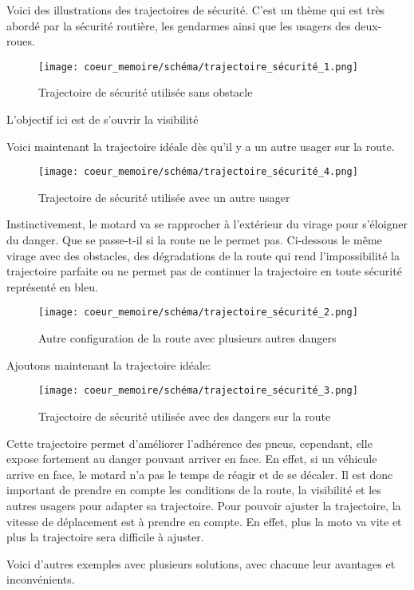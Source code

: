 \vspace{0.5cm}
Voici des illustrations des trajectoires de sécurité. C'est un thème qui est très abordé par la sécurité routière, les gendarmes ainsi que les usagers des deux-roues. 
\begin{figure}[H]
    \centering
    \texttt{[image: coeur\_memoire/schéma/trajectoire\_sécurité\_1.png]} 
    \caption{Trajectoire de sécurité utilisée sans obstacle}
\end{figure}
L'objectif ici est de s'ouvrir la visibilité

Voici maintenant la trajectoire idéale dès qu'il y a un autre usager sur la route.
\begin{figure}[H]
    \centering
    \texttt{[image: coeur\_memoire/schéma/trajectoire\_sécurité\_4.png]} 
    \caption{Trajectoire de sécurité utilisée avec un autre usager}
\end{figure}
Instinctivement, le motard va se rapprocher à l'extérieur du virage pour s'éloigner du danger.
Que se passe-t-il si la route ne le permet pas. Ci-dessous le même virage avec des obstacles, des dégradations de la route qui rend l'impossibilité la trajectoire parfaite ou ne permet pas de continuer la trajectoire en toute sécurité représenté en bleu. 
\begin{figure}[H]
    \centering
    \texttt{[image: coeur\_memoire/schéma/trajectoire\_sécurité\_2.png]} 
    \caption{Autre configuration de la route avec plusieurs autres dangers}
\end{figure}
Ajoutons maintenant la trajectoire idéale:
\begin{figure}[H]
    \centering
    \texttt{[image: coeur\_memoire/schéma/trajectoire\_sécurité\_3.png]} 
    \caption{Trajectoire de sécurité utilisée avec des dangers sur la route}
\end{figure}
Cette trajectoire permet d'améliorer l'adhérence des pneus, cependant, elle expose fortement au danger pouvant arriver en face. En effet, si un véhicule arrive en face, le motard n'a pas le temps de réagir et de se décaler. Il est donc important de prendre en compte les conditions de la route, la visibilité et les autres usagers pour adapter sa trajectoire. Pour pouvoir ajuster la trajectoire, la vitesse de déplacement est à prendre en compte. En effet, plus la moto va vite et plus la trajectoire sera difficile à ajuster.

Voici d'autres exemples avec plusieurs solutions, avec chacune leur avantages et inconvénients.

